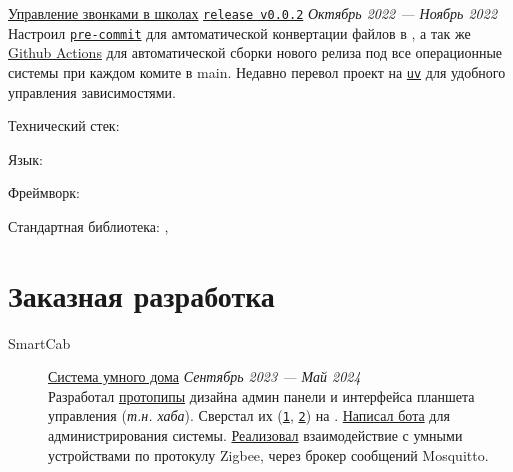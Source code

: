 \documentclass[margin,line]{resume}
\begin{document}
\begin{resume}
\begin{description}
      \vspace{3mm}

    \item[SchoolRing]\small{\href{https://github.com/alchemmist/school-ring}{Управление
        звонками в школах}
        \begingroup
        \hypersetup{urlcolor=blue!30}
        \href{https://github.com/}{\texttt{release v0.0.2}}
        \endgroup
        \hfill
      \textsl{Октябрь 2022 — Ноябрь 2022\vspace{2mm}}}\\
      Настроил
      \href{https://github.com}{\texttt{pre-commit}} для
      амтоматической конвертации  файлов в
      , а так же \href{https://github.com}{Github
      Actions} для автоматической сборки нового релиза под все
      операционные системы при каждом комите в main. Недавно перевол
      проект на \href{https://astral.sh/blog/uv}{\texttt{uv}} для
      удобного управления зависимостями.

      Технический стек:
      \begin{list2}
      \item{Язык: }
      \item{Фреймворк: }
      \item{Стандартная библиотека: ,
        }
      \end{list2}

  \end{description}

  \section{\mysidestyle Заказная разработка}\vspace{2mm}

  \begin{description}

    \item[SmartCab]\small{\href{https://github.com/smart-cab}{Система
        умного дома} \hfill
      \textsl{Сентябрь 2023 — Май 2024\vspace{2mm}}}\\
      Разработал
      \href{https://www.figma.com/design/8H1tFpxgmIDV1xp06ndi73/SmartCab?node-id=0-1&p=f}{протопипы}
      дизайна админ панели и интерфейса планшета управления
      (\textit{т.н. хаба}). Сверстал их
      (\texttt{\href{https://github.com/smart-cab/smartcab-hub/tree/main/frontend/src}{1}},
      \texttt{\href{https://github.com/smart-cab/smartcab-dashboard/tree/main/frontend/src}{2}})
      на .
      \href{https://github.com/smart-cab/smartcab-bot}{Написал бота}
      для администрирования системы.
      \href{https://github.com/smart-cab/smartcab-hub/blob/main/backend/smartcab/interface/mqtt.py}{Реализовал}
      взаимодействие с умными устройствами по протокулу Zigbee, через
      брокер сообщений Mosquitto.


\end{description}
\end{resume}
\end{document}

